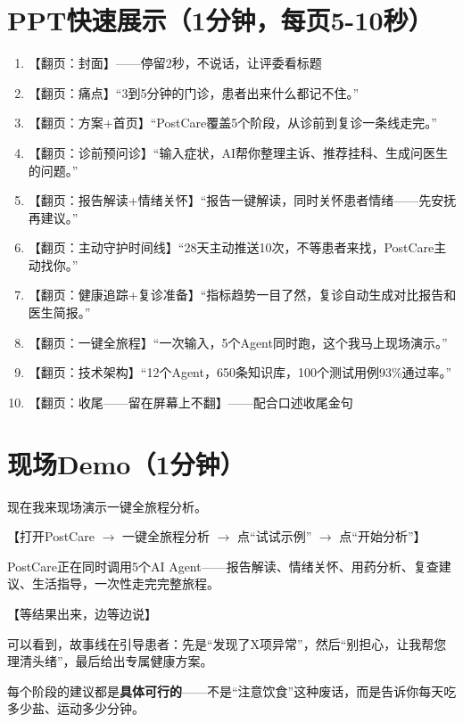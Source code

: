 \documentclass[UTF8, a4paper, 11pt]{ctexart}
\begin{document}
\section{PPT快速展示（1分钟，每页5-10秒）}

\begin{enumerate}
    \item 【翻页：封面】——停留2秒，不说话，让评委看标题
    \item 【翻页：痛点】``3到5分钟的门诊，患者出来什么都记不住。''
    \item 【翻页：方案+首页】``PostCare覆盖5个阶段，从诊前到复诊一条线走完。''
    \item 【翻页：诊前预问诊】``输入症状，AI帮你整理主诉、推荐挂科、生成问医生的问题。''
    \item 【翻页：报告解读+情绪关怀】``报告一键解读，同时关怀患者情绪——先安抚再建议。''
    \item 【翻页：主动守护时间线】``28天主动推送10次，不等患者来找，PostCare主动找你。''
    \item 【翻页：健康追踪+复诊准备】``指标趋势一目了然，复诊自动生成对比报告和医生简报。''
    \item 【翻页：一键全旅程】``一次输入，5个Agent同时跑，这个我马上现场演示。''
    \item 【翻页：技术架构】``12个Agent，650条知识库，100个测试用例93\%通过率。''
    \item 【翻页：收尾——留在屏幕上不翻】——配合口述收尾金句
\end{enumerate}

\section{现场Demo（1分钟）}

现在我来现场演示一键全旅程分析。

{\color{gray}\small 【打开PostCare $\to$ 一键全旅程分析 $\to$ 点``试试示例'' $\to$ 点``开始分析''】}

PostCare正在同时调用5个AI Agent——报告解读、情绪关怀、用药分析、复查建议、生活指导，一次性走完完整旅程。

{\color{gray}\small 【等结果出来，边等边说】}

可以看到，故事线在引导患者：先是``发现了X项异常''，然后``别担心，让我帮您理清头绪''，最后给出专属健康方案。

每个阶段的建议都是\textbf{具体可行的}——不是``注意饮食''这种废话，而是告诉你每天吃多少盐、运动多少分钟。
\end{document}
